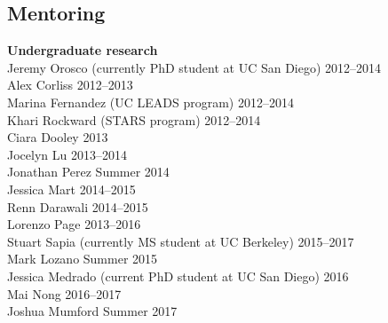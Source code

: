\documentclass[]{res}
\begin{document}
\begin{resume}
\section{Mentoring}
\vspace{0.1in}

\textbf{Undergraduate research} \\
Jeremy Orosco (currently PhD student at UC San Diego) \hfill 2012--2014 \\
Alex Corliss \hfill 2012--2013 \\
Marina Fernandez (UC LEADS program) \hfill 2012--2014 \\
Khari Rockward (STARS program) \hfill 2012--2014 \\
Ciara Dooley \hfill 2013 \\
Jocelyn Lu \hfill 2013--2014 \\
Jonathan Perez \hfill Summer 2014 \\
Jessica Mart \hfill 2014--2015 \\
Renn Darawali \hfill 2014--2015 \\
Lorenzo Page \hfill 2013--2016 \\
Stuart Sapia (currently MS student at UC Berkeley) \hfill 2015--2017 \\
Mark Lozano \hfill Summer 2015 \\
Jessica Medrado (current PhD student at UC San Diego) \hfill 2016 \\
Mai Nong \hfill 2016--2017 \\
Joshua Mumford \hfill Summer 2017



\end{resume}
\end{document}
